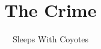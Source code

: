 \documentclass[ebook,12pt,oneside,onecolumn,openright,showtrim]{memoir}
\title{The Crime}
\author{Sleeps With Coyotes}
\date{}
\begin{document}
\frontmatter
\begin{titlingpage}
\setlength{\droptitle}{80pt}
\maketitle
\end{titlingpage}

\mainmatter
\pagestyle{plain}




\backmatter
\end{document}
